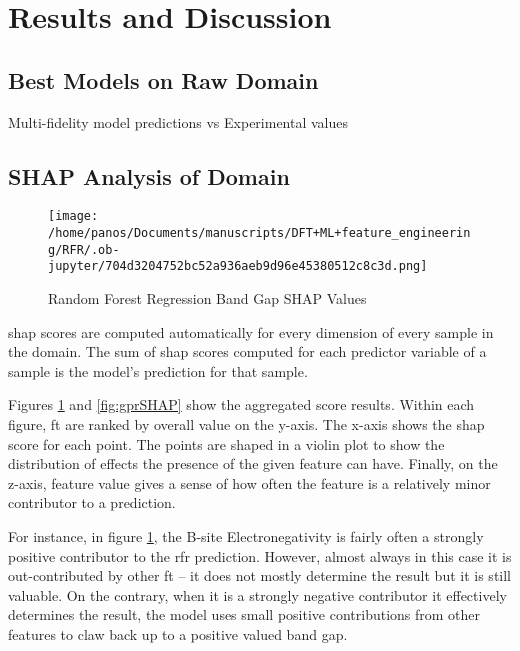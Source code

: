 \documentclass[aip, jmp, amsmath, amssymb, nofootinbib]{revtex4-2}
\begin{document}
\section*{Results and Discussion}
\label{sec:orgfdcdd75}
\subsection*{Best Models on Raw Domain}
\label{sec:org20ad32c}
 
\begin{multicol}
\centering

\caption{\label{fig:pairplots} Multi-fidelity model predictions vs Experimental values}
\end{multicol}

\subsection*{SHAP Analysis of Domain}
\label{sec:orga996ac6}
\begin{figure}[htbp]
\centering
\texttt{[image: /home/panos/Documents/manuscripts/DFT+ML+feature\_engineering/RFR/.ob-jupyter/704d3204752bc52a936aeb9d96e45380512c8c3d.png]}
\caption{\label{fig:rfrSHAP} Random Forest Regression Band Gap SHAP Values}
\end{figure}

\acrshort{shap} scores are computed automatically for every dimension of every
sample in the domain. The sum of \acrshort{shap} scores computed for each
predictor variable of a sample is the model's prediction for that
sample\cite{lundberg-2017-unified-approac}.

Figures \ref{fig:rfrSHAP} and \ref{fig:gprSHAP} show the aggregated score
results. Within each figure, \gls{ft} are ranked by overall value on
the y-axis. The x-axis shows the \acrshort{shap} score for each point. The points
are shaped in a violin plot to show the distribution of effects the
presence of the given feature can have. Finally, on the z-axis,
feature value gives a sense of how often the feature is a relatively
minor contributor to a prediction.

For instance, in figure \ref{fig:rfrSHAP}, the B-site Electronegativity
is fairly often a strongly positive contributor to the \acrshort{rfr}
prediction. However, almost always in this case it is out-contributed
by other \gls{ft} -- it does not mostly determine the result but it is
still valuable. On the contrary, when it is a strongly negative
contributor it effectively determines the result, the model uses small
positive contributions from other features to claw back up to a
positive valued band gap.
\end{document}
